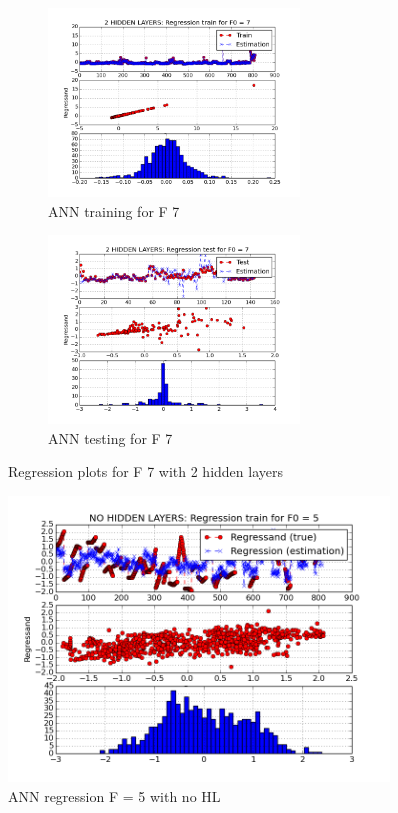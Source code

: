 \documentclass{article}
\begin{document}
\begin{figure}[h]
 
\begin{subfigure}{0.5\textwidth}
\includegraphics[width=0.9\linewidth, height=5cm]{pictures/regrF72HL.png} 
\caption{ANN training for F 7}
\label{fig:regrF57HL}
\end{subfigure}
\begin{subfigure}{0.5\textwidth}
\includegraphics[width=0.9\linewidth, height=5cm]{pictures/regrF72HL_TEST.png}
\caption{ANN testing for F 7}
\label{fig:regrF57HL_TEST}
\end{subfigure}
 
\caption{Regression plots for F 7 with 2 hidden layers}
\label{fig:regrF57HL_PLOTS}
\end{figure}


\label{lst: ANN regression}

\begin{figure}[H]
	\centering
	\includegraphics[width=0.9\textwidth]{pictures/regrF5NOHL.png}
	\caption{ANN regression F = 5 with no HL}\label{fig:regrF5NOHL}
\end{figure}
\end{document}
